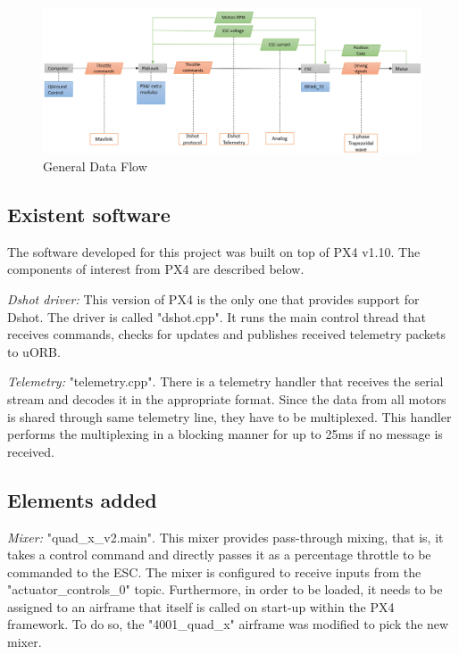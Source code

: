\begin{figure} 
    \centering
    \includegraphics[width=1.0\textwidth]{images/data_flow_diagram.PNG}
    \caption{General Data Flow}
    \label{fig:data_flow}
\end{figure}

\subsection{Existent software}
The software developed for this project was built on top of PX4 v1.10. The components of interest from PX4 are described below.
\newline

\textit{Dshot driver: } This version of PX4 is the only one that provides support for Dshot. The driver is called "dshot.cpp". It runs the main control thread that receives commands, checks for updates and publishes received telemetry packets to uORB.
\newline

\textit{Telemetry: } "telemetry.cpp". There is a telemetry handler that receives the serial stream and decodes it in the appropriate format. Since the data from all motors is shared through same telemetry line, they have to be multiplexed. This handler performs the multiplexing in a blocking manner for up to 25ms if no message is received.
\newline

\subsection{Elements added}

\textit{Mixer: } "quad\_x\_v2.main". This mixer provides pass-through mixing, that is, it takes a control command and directly passes it as a percentage throttle to be commanded to the ESC. The mixer is configured to receive inputs from the "actuator\_controls\_0" topic. Furthermore, in order to be loaded, it needs to be assigned to an airframe that itself is called on start-up within the PX4 framework. To do so, the "4001\_quad\_x" airframe was modified to pick the new mixer.
\newline

